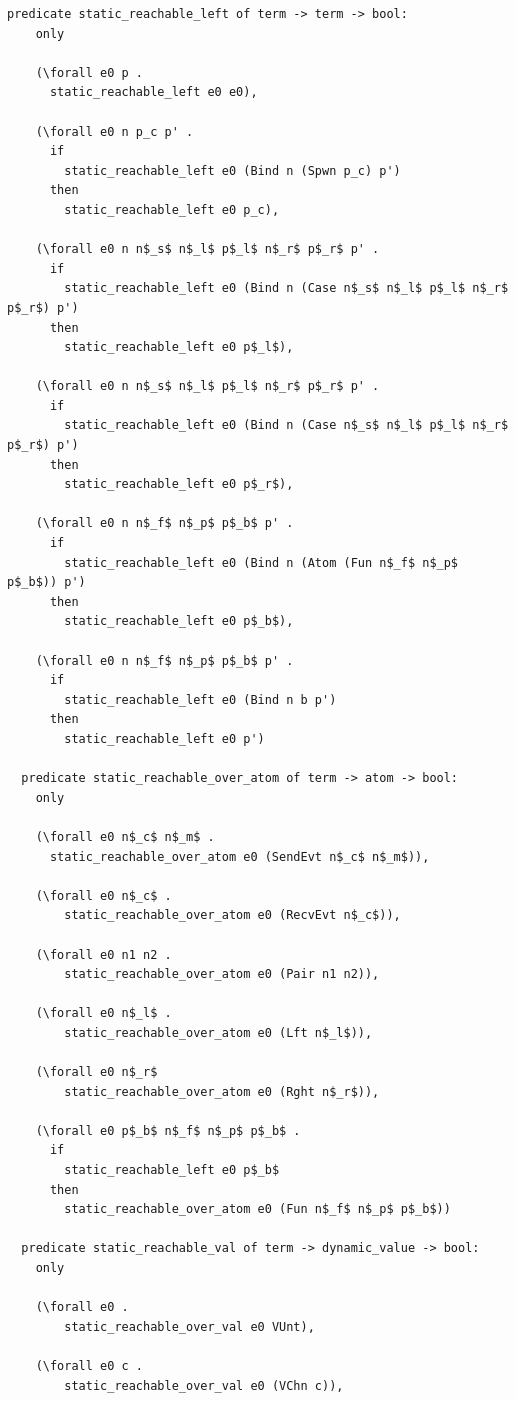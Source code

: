 \documentclass[10pt]{article}
\begin{document}
\begin{lstlisting}[language=logic, mathescape]
  predicate static_reachable_left of term -> term -> bool:
    only

    (\forall e0 p .
      static_reachable_left e0 e0),

    (\forall e0 n p_c p' .
      if 
        static_reachable_left e0 (Bind n (Spwn p_c) p')
      then
        static_reachable_left e0 p_c),

    (\forall e0 n n$_s$ n$_l$ p$_l$ n$_r$ p$_r$ p' .
      if
        static_reachable_left e0 (Bind n (Case n$_s$ n$_l$ p$_l$ n$_r$ p$_r$) p')
      then
        static_reachable_left e0 p$_l$),

    (\forall e0 n n$_s$ n$_l$ p$_l$ n$_r$ p$_r$ p' .
      if
        static_reachable_left e0 (Bind n (Case n$_s$ n$_l$ p$_l$ n$_r$ p$_r$) p')
      then
        static_reachable_left e0 p$_r$),

    (\forall e0 n n$_f$ n$_p$ p$_b$ p' .
      if
        static_reachable_left e0 (Bind n (Atom (Fun n$_f$ n$_p$ p$_b$)) p')
      then
        static_reachable_left e0 p$_b$),

    (\forall e0 n n$_f$ n$_p$ p$_b$ p' .
      if
        static_reachable_left e0 (Bind n b p')
      then
        static_reachable_left e0 p')

  predicate static_reachable_over_atom of term -> atom -> bool:
    only

    (\forall e0 n$_c$ n$_m$ .
      static_reachable_over_atom e0 (SendEvt n$_c$ n$_m$)),

    (\forall e0 n$_c$ .
        static_reachable_over_atom e0 (RecvEvt n$_c$)),

    (\forall e0 n1 n2 .
        static_reachable_over_atom e0 (Pair n1 n2)),

    (\forall e0 n$_l$ .
        static_reachable_over_atom e0 (Lft n$_l$)),

    (\forall e0 n$_r$
        static_reachable_over_atom e0 (Rght n$_r$)),

    (\forall e0 p$_b$ n$_f$ n$_p$ p$_b$ . 
      if
        static_reachable_left e0 p$_b$ 
      then
        static_reachable_over_atom e0 (Fun n$_f$ n$_p$ p$_b$))

  predicate static_reachable_val of term -> dynamic_value -> bool:
    only

    (\forall e0 .
        static_reachable_over_val e0 VUnt),

    (\forall e0 c .
        static_reachable_over_val e0 (VChn c)),


\end{lstlisting}
\end{document}
